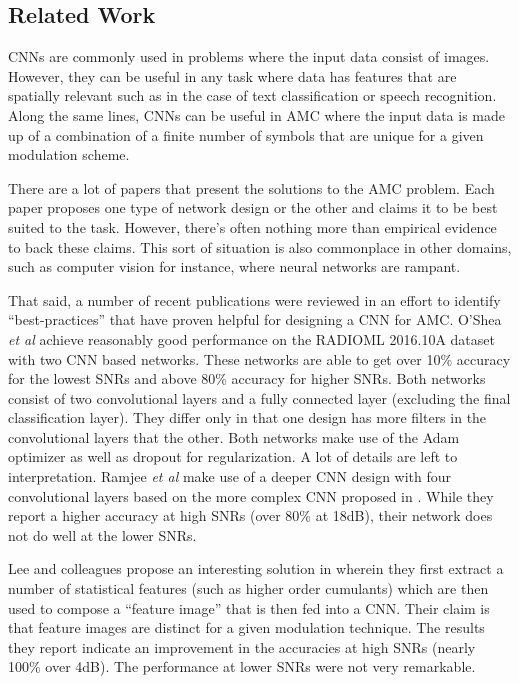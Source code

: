 \documentclass[journal,onecolumn]{IEEEtran}
\begin{document}
\subsection{Related Work}

CNNs are commonly used in problems where the input data consist of images. However, they can be useful in any task where data has features that are spatially relevant such as in the case of text classification or speech recognition. Along the same lines, CNNs can be useful in AMC where the input data is made up of a combination of a finite number of symbols that are unique for a given modulation scheme. 

There are a lot of papers that present the solutions to the AMC problem. Each paper proposes one type of network design or the other and claims it to be best suited to the task. However, there’s often nothing more than empirical evidence to back these claims. This sort of situation is also commonplace in other domains, such as computer vision for instance, where neural networks are rampant.

That said, a number of recent publications were reviewed in an effort to identify “best-practices” that have proven helpful for designing a CNN for AMC. O’Shea \textit{et al} \cite{cnn2} achieve reasonably good performance on the RADIOML 2016.10A dataset with two CNN based networks. These networks are able to get over 10\% accuracy for the lowest SNRs and above 80\% accuracy for higher SNRs. Both networks consist of two convolutional layers and a fully connected layer (excluding the final classification layer). They differ only in that one design has more filters in the convolutional layers that the other. Both networks make use of the Adam optimizer as well as dropout for regularization. A lot of details are left to interpretation. Ramjee \textit{et al} \cite{cnn1} make use of a deeper CNN design with four convolutional layers based on the more complex CNN proposed in \cite{cnn2}. While they report a higher accuracy at high SNRs (over 80\% at 18dB), their network does not do well at the lower SNRs. 

Lee and colleagues propose an interesting solution in \cite{featImage} wherein they first extract a number of statistical features (such as higher order cumulants) which are then used to compose a “feature image” that is then fed into a CNN. Their claim is that feature images are distinct for a given modulation technique. The results they report indicate an improvement in the accuracies at high SNRs (nearly 100\% over 4dB). The performance at lower SNRs were not very remarkable.
\end{document}
